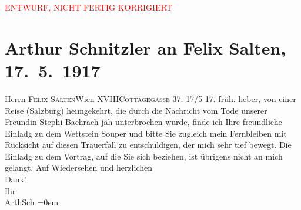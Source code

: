 
\begin{center}
            \textcolor{red}{ENTWURF, NICHT FERTIG KORRIGIERT}
                      \end{center}
            
         
         \renewcommand{\erwaehntePersonen}{Personen: Stefanie Bachrach, Felix Salten, Oscar Wettstein}
         \renewcommand{\erwaehnteOrte}{Orte: Cottagegasse, Salzburg, Wien, XVIII., Währing}
         \renewcommand{\erwaehnteWerke}{}
               \section[Arthur Schnitzler an Felix Salten, 17. 5. 1917]{ Arthur Schnitzler an Felix Salten, 17. 5. 1917}\nopagebreak{}\rehead{ }\begin{ledgroupsized}[t]{13cm}\normalsize\beginnumbering \toendnotes[C]{\smallbreak\pagebreak[2]} 
\pstart{}{\pb}Herrn \textsc{Felix Salten}\pend{}\pstart{}Wien XVIII\pend{}\pstart{}\textsc{Cottagegasse 37}.\pend{}{\bigskip}\pstart
           \raggedleft{}{\pb}17/5 17.\pend
           \pstart
           \raggedleft{}früh. \pend
           \pstart
           lieber, von einer Reise (Salzburg) heimgekehrt, die durch die Nachricht vom Tode unserer Freundin Stephi Bachrach jäh unterbrochen wurde, finde ich Ihre
               freundliche Einladg zu dem Wettstein Souper und bitte
               Sie zugleich mein Fernbleiben mit Rücksicht auf diesen Trauerfall zu entschuldigen,
               der mich sehr tief bewegt. \pend
           \pstart
           Die Einladg zu dem Vortrag, auf die Sie sich beziehen, ist übrigens nicht an mich
               gelangt. \pend
           \pstart
           Auf Wiedersehen und herzlichen {\\[\baselineskip]}Dank! {\\[\baselineskip]}Ihr {\\[\baselineskip]}\spacefill\mbox{ArthSch}\pend
           \leftskip=0em{}
         
         \endnumbering{}\end{ledgroupsized}\begin{anhang}\end{anhang}\newcommand{\dateiname}{L03019}\newcommand{\titel}{Arthur Schnitzler an Felix Salten, 17. 5. 1917}\newcommand{\editorInnen}{Martin Anton Müller und Laura Untner}
      